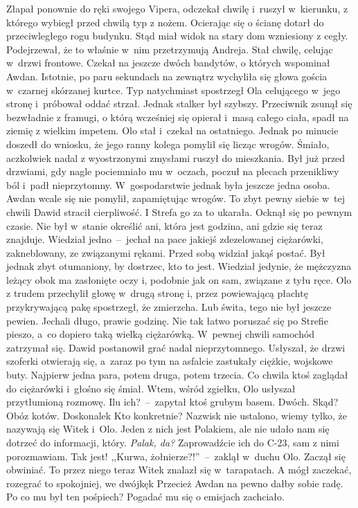 \documentclass[../MAIN.tex]{subfiles}
\begin{document}
Złapał ponownie do ręki swojego Vipera, odczekał chwilę i~ruszył w~kierunku, z którego wybiegł przed chwilą typ z nożem. Ocierając się o ścianę dotarł do przeciwległego rogu budynku. Stąd miał widok na stary dom wzniesiony z cegły. Podejrzewał, że to właśnie w~nim przetrzymują Andreja. Stał chwilę, celując w~drzwi frontowe. Czekał na jeszcze dwóch bandytów, o których wspominał Awdan. Istotnie, po paru sekundach na zewnątrz wychyliła się głowa gościa w~czarnej skórzanej kurtce. Typ natychmiast spostrzegł Ola celującego w~jego stronę i~próbował oddać strzał. Jednak stalker był szybszy. Przeciwnik zsunął się bezwładnie z framugi, o którą wcześniej się opierał i~masą całego ciała, spadł na ziemię z wielkim impetem. Olo stał i~czekał na ostatniego. Jednak po minucie doszedł do wniosku, że jego ranny kolega pomylił się licząc wrogów. Śmiało, aczkolwiek nadal z wyostrzonymi zmysłami ruszył do mieszkania. Był już przed drzwiami, gdy nagle pociemniało mu w~oczach, poczuł na plecach przenikliwy ból i~padł nieprzytomny.
 W~gospodarstwie jednak była jeszcze jedna osoba. Awdan wcale się nie pomylił, zapamiętując wrogów. To zbyt pewny siebie w~tej chwili Dawid stracił cierpliwość. I Strefa go za to ukarała.
Ocknął się po pewnym czasie. Nie był w~stanie określić ani, która jest godzina, ani gdzie się teraz znajduje. Wiedział jedno~--~jechał na pace jakiejś zdezelowanej ciężarówki, zakneblowany, ze związanymi rękami. Przed sobą widział jakąś postać. Był jednak zbyt otumaniony, by dostrzec, kto to jest. Wiedział jedynie, że mężczyzna leżący obok ma zasłonięte oczy i, podobnie jak on sam, związane z tyłu ręce. Olo z trudem przechylił głowę w~drugą stronę i, przez powiewającą płachtę przykrywającą pakę spostrzegł, że zmierzcha. Lub świta, tego nie był jeszcze pewien.
Jechali długo, prawie godzinę. Nie tak łatwo poruszać się po Strefie pieszo, a~co dopiero taką wielką ciężarówką. W~pewnej chwili samochód zatrzymał się. Dawid postanowił grać nadal nieprzytomnego. Usłyszał, że drzwi szoferki otwierają się, a~zaraz po tym na asfalcie zastukały ciężkie, wojskowe buty. Najpierw jedna para, potem druga, potem trzecia. Co chwila ktoś zaglądał do ciężarówki i~głośno się śmiał. Wtem, wśród zgiełku, Olo usłyszał przytłumioną rozmowę.
\sd
\xx Ilu ich?~--~zapytał ktoś grubym basem.
\xx Dwóch.
\xx Skąd?
\xx Obóz kotów.
\xx Doskonale\3k Kto konkretnie?
\xx Nazwisk nie ustalono, wiemy tylko, że nazywają się Witek i~Olo. Jeden z nich jest Polakiem, ale nie udało nam się dotrzeć do informacji, który.
\xx \textit{Palak, da?} Zaprowadźcie ich do C-23, sam z nimi porozmawiam.
\xx Tak jest!
\qm
,,Kurwa, żołnierze?!''~--~zaklął w~duchu Olo. Zaczął się obwiniać. To przez niego teraz Witek znalazł się w~tarapatach. A mógł zaczekać, rozegrać to spokojniej, we dwójkę\3k Przecież Awdan na pewno dałby sobie radę. Po co mu był ten pośpiech? Pogadać mu się o emisjach zachciało.
\end{document}
